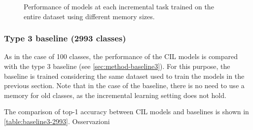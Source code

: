 \begin{figure}[H]
	\centering
    \qquad
	\caption{Performance of models at each incremental task trained on the entire dataset using different memory sizes.}%
	\label{fig:exp6}%
\end{figure}

\newpage

\subsubsection{Type 3 baseline (2993 classes)}
As in the case of 100 classes, the performance of the CIL models is compared with the type 3 baseline (see \autoref{sec:method-baseline3}). For this purpose, the baseline is trained considering the same dataset used to train the models in the previous section.
Note that in the case of the baseline, there is no need to use a memory for old classes, as the incremental learning setting does not hold.
 
The comparison of top-1 accuracy between CIL models and baselines is shown in \autoref{table:baseline3-2993}.
Osservazioni


